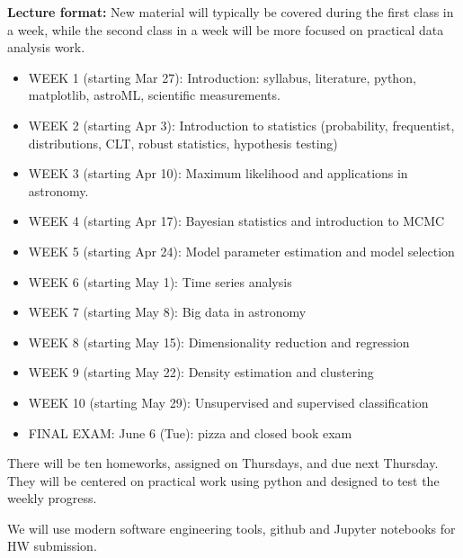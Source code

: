 \documentclass[10pt]{article}
\begin{document}
{\bf Lecture format:}
New material will typically be covered during the first class in a week, while
the second class in a week will be more focused on practical data analysis work. 

\newpage 
\begin{itemize}
\item WEEK 1 (starting Mar 27): 
      Introduction: syllabus, literature, python, matplotlib, astroML, scientific measurements. 
      
\item WEEK  2 (starting Apr 3):  Introduction to statistics (probability, frequentist, distributions, CLT, 
             robust statistics, hypothesis testing)

\item WEEK  3 (starting Apr 10):  Maximum likelihood and applications in astronomy.

\item WEEK  4 (starting Apr 17):  Bayesian statistics and introduction to MCMC

\item WEEK  5 (starting Apr 24):  Model parameter estimation and model selection

\item WEEK  6 (starting May 1):   Time series analysis

\item WEEK  7 (starting May 8):   Big data in astronomy

\item WEEK  8 (starting May 15): Dimensionality reduction and regression

\item WEEK  9 (starting May 22):  Density estimation and clustering

\item WEEK  10 (starting May 29):  Unsupervised and supervised classification

\item FINAL EXAM:  June 6 (Tue): pizza and closed book exam

\end{itemize}


\vskip 0.2in


There will be ten homeworks, assigned on Thursdays, and due next Thursday. They will
be centered on practical work using python and designed to test the weekly progress. 

We will use modern software engineering tools, github and Jupyter notebooks for HW submission. 
\end{document}
